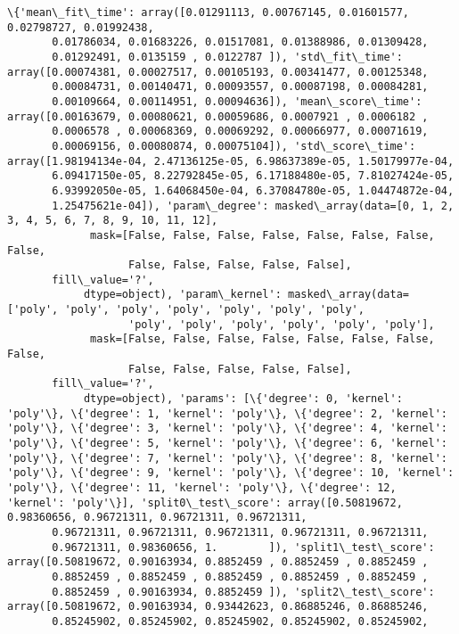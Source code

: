 \documentclass[11pt]{article}
\begin{document}
    \begin{Verbatim}[commandchars=\\\{\}]
\{'mean\_fit\_time': array([0.01291113, 0.00767145, 0.01601577, 0.02798727, 0.01992438,
       0.01786034, 0.01683226, 0.01517081, 0.01388986, 0.01309428,
       0.01292491, 0.0135159 , 0.0122787 ]), 'std\_fit\_time': array([0.00074381, 0.00027517, 0.00105193, 0.00341477, 0.00125348,
       0.00084731, 0.00140471, 0.00093557, 0.00087198, 0.00084281,
       0.00109664, 0.00114951, 0.00094636]), 'mean\_score\_time': array([0.00163679, 0.00080621, 0.00059686, 0.0007921 , 0.0006182 ,
       0.0006578 , 0.00068369, 0.00069292, 0.00066977, 0.00071619,
       0.00069156, 0.00080874, 0.00075104]), 'std\_score\_time': array([1.98194134e-04, 2.47136125e-05, 6.98637389e-05, 1.50179977e-04,
       6.09417150e-05, 8.22792845e-05, 6.17188480e-05, 7.81027424e-05,
       6.93992050e-05, 1.64068450e-04, 6.37084780e-05, 1.04474872e-04,
       1.25475621e-04]), 'param\_degree': masked\_array(data=[0, 1, 2, 3, 4, 5, 6, 7, 8, 9, 10, 11, 12],
             mask=[False, False, False, False, False, False, False, False,
                   False, False, False, False, False],
       fill\_value='?',
            dtype=object), 'param\_kernel': masked\_array(data=['poly', 'poly', 'poly', 'poly', 'poly', 'poly', 'poly',
                   'poly', 'poly', 'poly', 'poly', 'poly', 'poly'],
             mask=[False, False, False, False, False, False, False, False,
                   False, False, False, False, False],
       fill\_value='?',
            dtype=object), 'params': [\{'degree': 0, 'kernel': 'poly'\}, \{'degree': 1, 'kernel': 'poly'\}, \{'degree': 2, 'kernel': 'poly'\}, \{'degree': 3, 'kernel': 'poly'\}, \{'degree': 4, 'kernel': 'poly'\}, \{'degree': 5, 'kernel': 'poly'\}, \{'degree': 6, 'kernel': 'poly'\}, \{'degree': 7, 'kernel': 'poly'\}, \{'degree': 8, 'kernel': 'poly'\}, \{'degree': 9, 'kernel': 'poly'\}, \{'degree': 10, 'kernel': 'poly'\}, \{'degree': 11, 'kernel': 'poly'\}, \{'degree': 12, 'kernel': 'poly'\}], 'split0\_test\_score': array([0.50819672, 0.98360656, 0.96721311, 0.96721311, 0.96721311,
       0.96721311, 0.96721311, 0.96721311, 0.96721311, 0.96721311,
       0.96721311, 0.98360656, 1.        ]), 'split1\_test\_score': array([0.50819672, 0.90163934, 0.8852459 , 0.8852459 , 0.8852459 ,
       0.8852459 , 0.8852459 , 0.8852459 , 0.8852459 , 0.8852459 ,
       0.8852459 , 0.90163934, 0.8852459 ]), 'split2\_test\_score': array([0.50819672, 0.90163934, 0.93442623, 0.86885246, 0.86885246,
       0.85245902, 0.85245902, 0.85245902, 0.85245902, 0.85245902,

\end{Verbatim}
\end{document}
